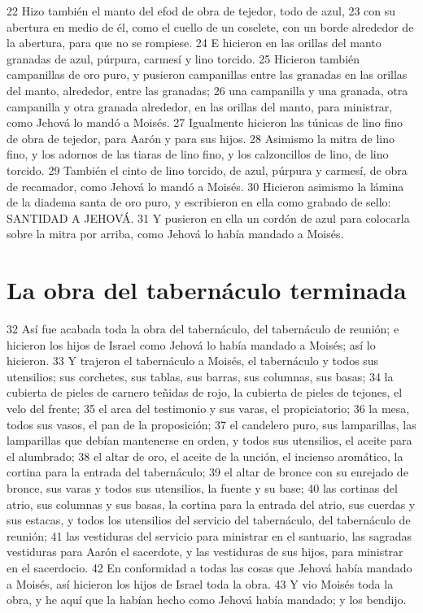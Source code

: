 22 Hizo también el manto del efod de obra de tejedor, todo de azul,
23 con su abertura en medio de él, como el cuello de un coselete, con un borde alrededor de la abertura, para que no se rompiese.
24 E hicieron en las orillas del manto granadas de azul, púrpura, carmesí y lino torcido.
25 Hicieron también campanillas de oro puro, y pusieron campanillas entre las granadas en las orillas del manto, alrededor, entre las granadas;
26 una campanilla y una granada, otra campanilla y otra granada alrededor, en las orillas del manto, para ministrar, como Jehová lo mandó a Moisés.
27 Igualmente hicieron las túnicas de lino fino de obra de tejedor, para Aarón y para sus hijos.
28 Asimismo la mitra de lino fino, y los adornos de las tiaras de lino fino, y los calzoncillos de lino, de lino torcido.
29 También el cinto de lino torcido, de azul, púrpura y carmesí, de obra de recamador, como Jehová lo mandó a Moisés.
30 Hicieron asimismo la lámina de la diadema santa de oro puro, y escribieron en ella como grabado de sello: SANTIDAD A JEHOVÁ.
31 Y pusieron en ella un cordón de azul para colocarla sobre la mitra por arriba, como Jehová lo había mandado a Moisés.

\section*{La obra del tabernáculo terminada}

32 Así fue acabada toda la obra del tabernáculo, del tabernáculo de reunión; e hicieron los hijos de Israel como Jehová lo había mandado a Moisés; así lo hicieron.
33 Y trajeron el tabernáculo a Moisés, el tabernáculo y todos sus utensilios; sus corchetes, sus tablas, sus barras, sus columnas, sus basas;
34 la cubierta de pieles de carnero teñidas de rojo, la cubierta de pieles de tejones, el velo del frente;
35 el arca del testimonio y sus varas, el propiciatorio;
36 la mesa, todos sus vasos, el pan de la proposición;
37 el candelero puro, sus lamparillas, las lamparillas que debían mantenerse en orden, y todos sus utensilios, el aceite para el alumbrado;
38 el altar de oro, el aceite de la unción, el incienso aromático, la cortina para la entrada del tabernáculo;
39 el altar de bronce con su enrejado de bronce, sus varas y todos sus utensilios, la fuente y su base;
40 las cortinas del atrio, sus columnas y sus basas, la cortina para la entrada del atrio, sus cuerdas y sus estacas, y todos los utensilios del servicio del tabernáculo, del tabernáculo de reunión;
41 las vestiduras del servicio para ministrar en el santuario, las sagradas vestiduras para Aarón el sacerdote, y las vestiduras de sus hijos, para ministrar en el sacerdocio.
42 En conformidad a todas las cosas que Jehová había mandado a Moisés, así hicieron los hijos de Israel toda la obra.
43 Y vio Moisés toda la obra, y he aquí que la habían hecho como Jehová había mandado; y los bendijo.

